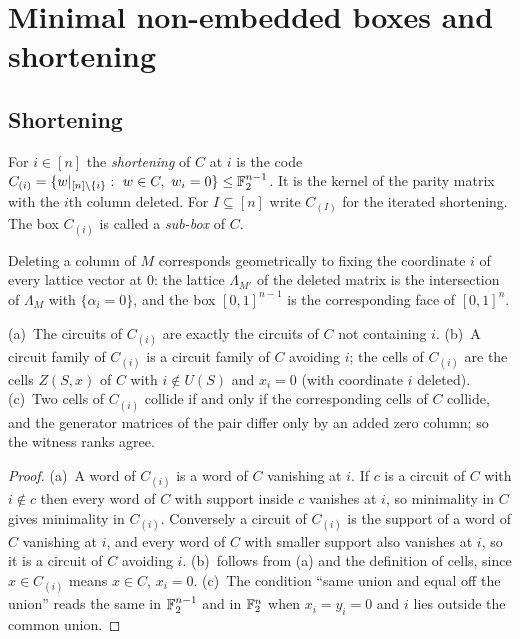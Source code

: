 \section{Minimal non-embedded boxes and shortening}\label{sec:minimal}

\subsection{Shortening}

\begin{definition}[Shortening]\label{def:shortening}
For $i\in[n]$ the \emph{shortening} of $C$ at $i$ is the code $C_{(i)}=\{w|_{[n]\setminus\{i\}}:\ w\in C,\ w_i=0\}\le\F_2^{n-1}$. It is the kernel of the parity matrix with the $i$th column deleted. For $I\subseteq[n]$ write $C_{(I)}$ for the iterated shortening. The box $C_{(i)}$ is called a \emph{sub-box} of $C$.
\end{definition}

Deleting a column of $M$ corresponds geometrically to fixing the coordinate $i$ of every lattice vector at $0$: the lattice $\Lambda_{M'}$ of the deleted matrix is the intersection of $\Lambda_M$ with $\{\alpha_i=0\}$, and the box $[0,1]^{n-1}$ is the corresponding face of $[0,1]^n$.

\begin{lemma}\label{lem:shortcirc}
(a)~The circuits of $C_{(i)}$ are exactly the circuits of $C$ not containing $i$.
(b)~A circuit family of $C_{(i)}$ is a circuit family of $C$ avoiding $i$; the cells of $C_{(i)}$ are the cells $Z(S,x)$ of $C$ with $i\notin U(S)$ and $x_i=0$ (with coordinate $i$ deleted).
(c)~Two cells of $C_{(i)}$ collide if and only if the corresponding cells of $C$ collide, and the generator matrices of the pair differ only by an added zero column; so the witness ranks agree.
\end{lemma}

\begin{proof}
(a)~A word of $C_{(i)}$ is a word of $C$ vanishing at $i$. If $c$ is a circuit of $C$ with $i\notin c$ then every word of $C$ with support inside $c$ vanishes at $i$, so minimality in $C$ gives minimality in $C_{(i)}$. Conversely a circuit of $C_{(i)}$ is the support of a word of $C$ vanishing at $i$, and every word of $C$ with smaller support also vanishes at $i$, so it is a circuit of $C$ avoiding $i$. (b)~follows from (a) and the definition of cells, since $x\in C_{(i)}$ means $x\in C$, $x_i=0$. (c)~The condition ``same union and equal off the union'' reads the same in $\mathbb F_2^{n-1}$ and in $\mathbb F_2^n$ when $x_i=y_i=0$ and $i$ lies outside the common union.
\end{proof}

